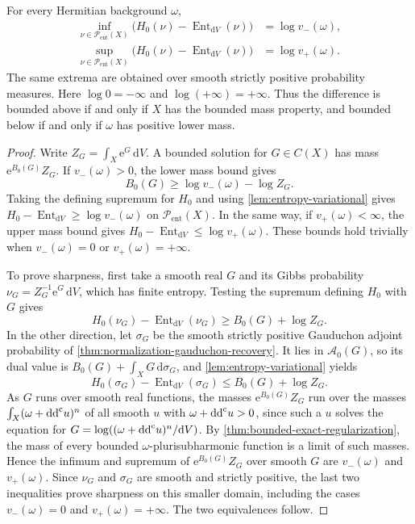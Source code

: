 \begin{proposition}\label{prop:entropy-mass-extrema}
For every Hermitian background $\omega$,
\[
 \begin{split}
 \inf_{\nu\in\mathcal P_{\mathrm{ent}}(X)}
      \bigl(H_0(\nu)-\operatorname{Ent}_{\mathrm{d}V}(\nu)\bigr)
       &=\log v_-(\omega),\\
 \sup_{\nu\in\mathcal P_{\mathrm{ent}}(X)}
      \bigl(H_0(\nu)-\operatorname{Ent}_{\mathrm{d}V}(\nu)\bigr)
       &=\log v_+(\omega).
 \end{split}
\]
The same extrema are obtained over smooth strictly positive probability measures. Here $\log0=-\infty$ and $\log(+\infty)=+\infty$. Thus the difference is bounded above if and only if $X$ has the bounded mass property, and bounded below if and only if $\omega$ has positive lower mass.
\end{proposition}
\begin{proof}
Write $Z_G=\int_X\mathrm{e}^G\,\mathrm{d}V$. A bounded solution for $G\in C(X)$ has mass $\mathrm{e}^{B_0(G)}Z_G$. If $v_-(\omega)>0$, the lower mass bound gives
\[
 B_0(G)\geq\log v_-(\omega)-\log Z_G.
\]
Taking the defining supremum for $H_0$ and using \cref{lem:entropy-variational} gives $H_0-\operatorname{Ent}_{\mathrm{d}V}\geq\log v_-(\omega)$ on $\mathcal P_{\mathrm{ent}}(X)$. In the same way, if $v_+(\omega)<\infty$, the upper mass bound gives $H_0-\operatorname{Ent}_{\mathrm{d}V}\leq\log v_+(\omega)$. These bounds hold trivially when $v_-(\omega)=0$ or $v_+(\omega)=+\infty$.

To prove sharpness, first take a smooth real $G$ and its Gibbs probability $\nu_G=Z_G^{-1}\mathrm{e}^G\,\mathrm{d}V$, which has finite entropy. Testing the supremum defining $H_0$ with $G$ gives
\[
 H_0(\nu_G)-\operatorname{Ent}_{\mathrm{d}V}(\nu_G)
       \geq B_0(G)+\log Z_G.
\]
In the other direction, let $\sigma_G$ be the smooth strictly positive Gauduchon adjoint probability of \cref{thm:normalization-gauduchon-recovery}. It lies in $\mathcal A_0(G)$, so its dual value is $B_0(G)+\int_XG\,\mathrm{d}\sigma_G$, and \cref{lem:entropy-variational} yields
\[
 H_0(\sigma_G)-\operatorname{Ent}_{\mathrm{d}V}(\sigma_G)
       \leq B_0(G)+\log Z_G.
\]
As $G$ runs over smooth real functions, the masses $\mathrm{e}^{B_0(G)}Z_G$ run over the masses $\int_X(\omega+\mathrm{dd}^{\mathrm{c}} u)^n$ of all smooth $u$ with $\omega+\mathrm{dd}^{\mathrm{c}} u>0$, since such a $u$ solves the equation for $G=\log((\omega+\mathrm{dd}^{\mathrm{c}} u)^n/\mathrm{d}V)$. By \cref{thm:bounded-exact-regularization}, the mass of every bounded $\omega$-plurisubharmonic function is a limit of such masses. Hence the infimum and supremum of $\mathrm{e}^{B_0(G)}Z_G$ over smooth $G$ are $v_-(\omega)$ and $v_+(\omega)$. Since $\nu_G$ and $\sigma_G$ are smooth and strictly positive, the last two inequalities prove sharpness on this smaller domain, including the cases $v_-(\omega)=0$ and $v_+(\omega)=+\infty$. The two equivalences follow.
\end{proof}

